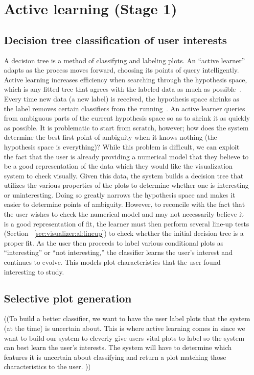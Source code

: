 \section{Active learning (Stage 1)}
\label{sec:visualizer:al}

\subsection{Decision tree classification of user interests}
\label{sec:visualizer:al:tree}

A decision tree is a method of classifying and labeling plots. An ``active
learner'' adapts as the process moves forward, choosing its points of query
intelligently. Active learning increases efficiency when searching through the
hypothesis space, which is any fitted tree that agrees with the labeled data as
much as possible~\cite{dasgupta2011}. Every time new data (a new label) is
received, the hypothesis space shrinks as the label removes certain classifiers
from the running~\cite{dasgupta2011}. An active learner queries from ambiguous
parts of the current hypothesis space so as to shrink it as quickly as possible.
It is problematic to start from scratch, however; how does the system determine
the best first point of ambiguity when it knows nothing (the hypothesis space is
everything)? While this problem is difficult, we can exploit the fact that the
user is already providing a numerical model that they believe to be a good
representation of the data which they would like the visualization system to
check visually. Given this data, the system builds a decision tree that utilizes
the various properties of the plots to determine whether one is interesting or
uninteresting. Doing so greatly narrows the hypothesis space and makes it easier
to determine points of ambiguity. However, to reconcile with the fact that the
user wishes to check the numerical model and may not necessarily believe it is a
good representation of fit, the learner must then perform several line-up tests
(Section ~\ref{sec:visualizer:al:lineup}) to check whether the initial decision
tree is a proper fit. As the user then proceeds to label various conditional
plots as ``interesting'' or ``not interesting,'' the classifier learns the
user’s interest and continues to evolve. This models plot characteristics that
the user found interesting to study.

\subsection{Selective plot generation}
\label{sec:visualizer:al:alplotgeneration}

((To build a better classifier, we want to have the user label plots that the
system (at the time) is uncertain about. This is where active learning comes in
since we want to build our system to cleverly give users vital plots to label so
the system can best learn the user’s interests. The system will have to
determine which features it is uncertain about classifying and return a plot
matching those characteristics to the user. ))
